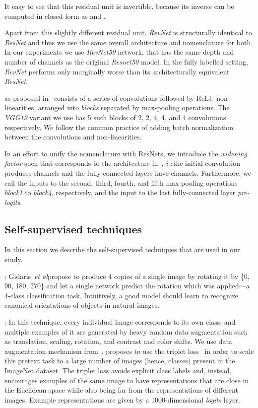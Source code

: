 \documentclass[10pt,twocolumn,letterpaper]{article}
\newcommand{\PAR}[1]{\vskip4pt \noindent {\bf #1~}}
\def\ie{\emph{i.e}\onedot} \def\Ie{\emph{I.e}\onedot}
\def\etal{\emph{et al}\onedot}
\begin{document}
It easy to see that this residual unit is invertible, because its inverse can be computed in closed form as
 and .


Apart from this slightly different residual unit, \emph{RevNet} is structurally identical to \emph{ResNet} and thus we use the same overall architecture and nomenclature for both.
In our experiments we use \emph{RevNet50} network, that has the same depth and number of channels as the
original \emph{Resnet50} model.
In the fully labelled setting, \emph{RevNet} performs only marginally worse than its architecturally equivalent \emph{ResNet}.

\PAR{VGG} as proposed in~\cite{simonyan2014very} consists of a series of  convolutions followed by ReLU non-linearities, arranged into \emph{blocks} separated by max-pooling operations.
The \emph{VGG19} variant we use has 5 such blocks of 2, 2, 4, 4, and 4 convolutions respectively.
We follow the common practice of adding batch normalization between the convolutions and non-linearities.


In an effort to unify the nomenclature with ResNets, we introduce the \emph{widening factor}  such that  corresponds to the architecture in~\cite{simonyan2014very}, \ie the initial convolution produces  channels and the fully-connected layers have  channels.
Furthermore, we call the inputs to the second, third, fourth, and fifth max-pooling operations \emph{block1} to \emph{block4}, respectively, and the input to the last fully-connected layer \emph{pre-logits}.


\subsection{Self-supervised techniques}\label{subsec:methods}

In this section we describe the self-supervised techniques that are used in our study.

\PAR{Rotation}\cite{gidaris2018unsupervised}: Gidaris~\etal propose to produce 4 copies of a single image by rotating it by \{0\degree, 90\degree, 180\degree, 270\degree\} and let a single network predict the rotation which was applied---a 4-class classification task.
Intuitively, a good model should learn to recognize canonical orientations of objects in natural images.

\PAR{Exemplar}\cite{dosovitskiy2014exemplar}:
In this technique, every individual image corresponds to its own class, and multiple examples of it are generated by heavy random data augmentation such as translation, scaling, rotation, and contrast and color shifts. We use data augmentation mechanism from~\cite{szegedy2015going}.
\cite{doersch2017multi} proposes to use the triplet loss~\cite{schroff2015facenet,HermansBeyer2017Arxiv} in order to scale this pretext task to a large number of images (hence, classes) present in the ImageNet dataset.
The triplet loss avoids explicit class labels and, instead, encourages examples of the same image to have representations that are close in the Euclidean space while also being far from the representations of different images.
Example representations are given by a 1000-dimensional \emph{logits} layer.
\end{document}
